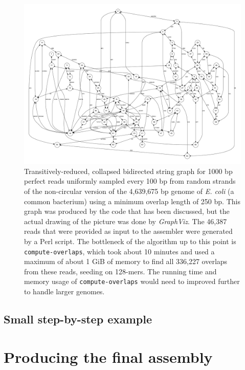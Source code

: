 \documentclass[12pt]{article}
\newcommand{\ProgramName}[1]{{\tt #1}}
\begin{document}
\begin{figure}
	\begin{center}
		\includegraphics[width=1.0\textwidth]{E_coli.pdf}
		\caption{Transitively-reduced, collapsed bidirected string graph for
		1000 bp perfect reads uniformly sampled every 100 bp from random strands
		of the non-circular version of the 4,639,675 bp genome of {\it E. coli}
		(a common bacterium) using a minimum overlap length of 250 bp.  This
		graph was produced by the code that has been discussed, but the actual
		drawing of the picture was done by {\it
		GraphViz}\cite{GraphVizPublication}.  The 46,387 reads
		that were provided as input to the assembler were generated by a Perl
		script.  The bottleneck of the algorithm up to this point is
		\ProgramName{compute-overlaps}, which took about 10 minutes and used a
		maximum of about 1 GiB of memory to find all 336,227 overlaps from these
		reads, seeding on 128-mers.  The running time and memory usage of
		\ProgramName{compute-overlaps} would need to improved further to handle
		larger genomes.}
		\label{fig:E_coli}
	\end{center}
\end{figure}

\subsection{Small step-by-step example}

\section{Producing the final assembly}
\end{document}
